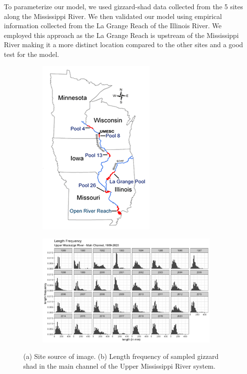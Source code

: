 \documentclass[preprint,review,12pt,authoryear]{elsarticle}
\begin{document}
To parameterize our model, we used gizzard-shad data collected from the 5 sites along the Mississippi River.  We then validated our model using empirical information collected from the La Grange Reach of the Illinois River. We employed this approach as the La Grange Reach is upstream of the Mississippi River making it a more distinct location  compared to the other sites and a good test for the model. 

\begin{figure}
\centering
\begin{subfigure}[b]{.43\textwidth}  
  \includegraphics[width=.6\textwidth]{figures/field_stations.png}
  \caption{}
  \label{fig:field_stations}
\end{subfigure}
\begin{subfigure}[b]{.43\textwidth} 
   \includegraphics[width=1.1\textwidth]{figures/LTRMmain.png}
   \caption{}
   \label{fig:LTRMmain}
\end{subfigure}
\caption{(a) Site source of image.  (b) Length frequency of sampled gizzard shad in the main channel of the Upper Mississippi River system.}
\end{figure}    
\end{document}

